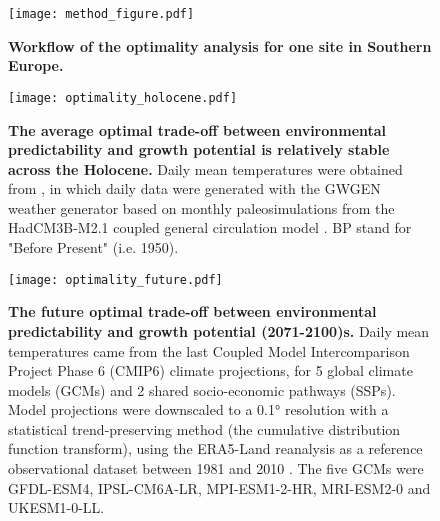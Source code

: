 \documentclass[11pt,letter]{article}
\begin{document}
\begin{figure}[hb]
\hspace*{-1.4cm}
\texttt{[image: method\_figure.pdf]}
\vspace*{-0.7cm}
\caption{\textbf{Workflow of the optimality analysis for one site in Southern Europe.}}
\label{fig:method}
\end{figure}

\clearpage

\begin{figure}[hb]
\hspace*{-1.2cm}
\texttt{[image: optimality\_holocene.pdf]}
\vspace*{-0.7cm}
\caption{\textbf{The average optimal trade-off between environmental predictability and growth potential is relatively stable across the Holocene.} Daily mean temperatures were obtained from \citet{VanderMeersch2024}, in which daily data were generated with the GWGEN weather generator \citep{Sommer2017} based on monthly paleosimulations from the HadCM3B-M2.1 coupled general circulation model \citep{Armstrong2019}. BP stand for "Before Present" (i.e. 1950).}
\label{fig:holocene}
\end{figure}

\begin{figure}[hb]
\centering
\texttt{[image: optimality\_future.pdf]}
\vspace*{-0.2cm}
\caption{\textbf{The future optimal trade-off between environmental predictability and growth potential (2071-2100)s.} Daily mean temperatures came from the last Coupled Model Intercomparison Project Phase 6 (CMIP6) climate  projections, for 5 global climate models (GCMs) and 2 shared socio-economic pathways (SSPs). Model projections were downscaled to a 0.1° resolution with a statistical trend-preserving method (the cumulative distribution function transform), using the ERA5-Land reanalysis as a reference observational dataset between 1981 and 2010 \citep{Noel2022}. The five GCMs were GFDL-ESM4, IPSL-CM6A-LR, MPI-ESM1-2-HR, MRI-ESM2-0 and UKESM1-0-LL.}
\label{fig:future}
\end{figure}




\end{document}
